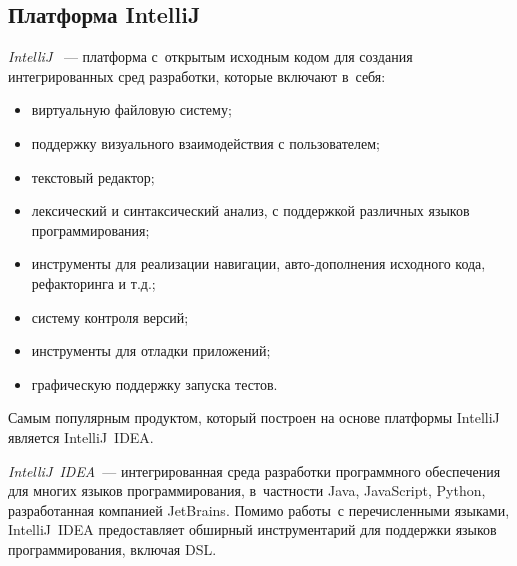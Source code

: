 \subsection{Платформа IntelliJ} \label{sub131}

\textit{IntelliJ} ~--- платформа с~открытым исходным кодом для создания интегрированных сред разработки, которые включают в~себя:

\begin{itemize}
\item{виртуальную файловую систему;}
\item{поддержку визуального взаимодействия с пользователем;}	
\item{текстовый редактор;}	
\item{лексический и синтаксический анализ, с поддержкой различных языков программирования;}
\item{инструменты для реализации навигации, авто-дополнения исходного кода, рефакторинга и т.д.;}
\item{систему контроля версий;}
\item{инструменты для отладки приложений;}
\item{графическую поддержку запуска тестов.}
\end{itemize}

Самым популярным продуктом, который построен на основе платформы IntelliJ является IntelliJ~IDEA.

\textit{IntelliJ~IDEA}~--- интегрированная среда разработки программного обеспечения для многих языков программирования, в~частности Java, JavaScript, Python, разработанная компанией JetBrains. Помимо работы~с перечисленными языками, IntelliJ~IDEA предоставляет обширный инструментарий для поддержки языков программирования, включая DSL.